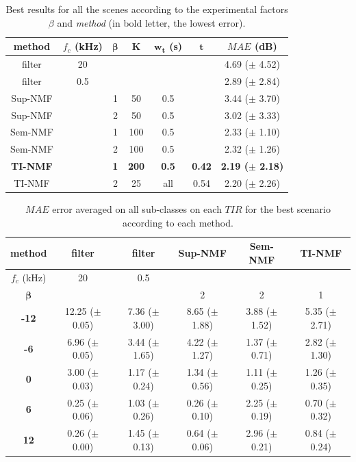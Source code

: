 \documentclass[twocolumn]{svjour3}          %
\begin{document}
\begin{table}[t]
\centering
\caption{Best results for all the scenes according to the experimental factors $\beta$ and \textit{method} (in bold letter, the lowest error).}
\begin{tabular}{@{}ccccccc@{}}
\toprule
\textbf{method} & $f_c$ (kHz) & $\mathbf{\beta}$ & $\mathbf{K}$ & $\mathbf{w_t}$ (s) &   $\mathbf{t}$ & \textbf{$MAE$} (dB) \\ \midrule
filter & 20  &  &  &  &  & 4.69 ($\pm$ 4.52) \\
filter & 0.5 &  &  &  &  & 2.89 ($\pm$ 2.84) \\ \hline \hline
Sup-NMF &  & 1 & 50 & 0.5  &  & 3.44 ($\pm$ 3.70) \\
Sup-NMF &  & 2 & 50 & 0.5  &  & 3.02 ($\pm$ 3.33) \\ \hline \hline
Sem-NMF &  & 1 & 100 & 0.5 &   & 2.33 ($\pm$ 1.10) \\
Sem-NMF &  & 2 & 100 & 0.5 &   & 2.32 ($\pm$ 1.26) \\ \hline \hline
\textbf{TI-NMF} &  & \textbf{1} & \textbf{200} & \textbf{0.5} &  \textbf{0.42} &\textbf{2.19 ($\pm$ 2.18)} \\
TI-NMF &  & 2 & 25 & all &  0.54 & 2.20 ($\pm$ 2.26)\\ \bottomrule
\end{tabular}
\label{tab:results}
\end{table}

\begin{table}[t]
\centering
\caption{$MAE$ error averaged on all sub-classes on each $TIR$ for the best scenario according to each method.}
\begin{tabular}{@{}cccccc@{}}
\toprule
\textbf{method} & filter & filter & Sup-NMF & Sem-NMF & TI-NMF \\ \midrule
$f_c$ (kHz) & 20 & 0.5 &  &  &  \\
$\mathbf{\beta}$ &  &  & 2 & 2 & 1 \\ \hline
\textbf{-12} & 12.25 ($\pm$ 0.05) & 7.36 ($\pm$ 3.00) & 8.65 ($\pm$ 1.88) & 3.88 ($\pm$ 1.52) & 5.35 ($\pm$ 2.71) \\
\textbf{-6} & 6.96 ($\pm$ 0.05) & 3.44 ($\pm$ 1.65) & 4.22 ($\pm$ 1.27) & 1.37 ($\pm$ 0.71)  & 2.82 ($\pm$ 1.30) \\
\textbf{0} & 3.00 ($\pm$ 0.03) & 1.17 ($\pm$ 0.24) & 1.34 ($\pm$ 0.56) & 1.11 ($\pm$ 0.25) & 1.26 ($\pm$ 0.35) \\
\textbf{6} & 0.25 ($\pm$ 0.06) & 1.03 ($\pm$ 0.26) & 0.26 ($\pm$ 0.10) & 2.25 ($\pm$ 0.19) & 0.70 ($\pm$ 0.32) \\
\textbf{12} & 0.26 ($\pm$ 0.00) & 1.45 ($\pm$ 0.13) & 0.64 ($\pm$ 0.06) & 2.96 ($\pm$ 0.21)  & 0.84 ($\pm$ 0.24) \\ \bottomrule
\end{tabular}
\label{tab:results_TIR}
\end{table}
\end{document}
